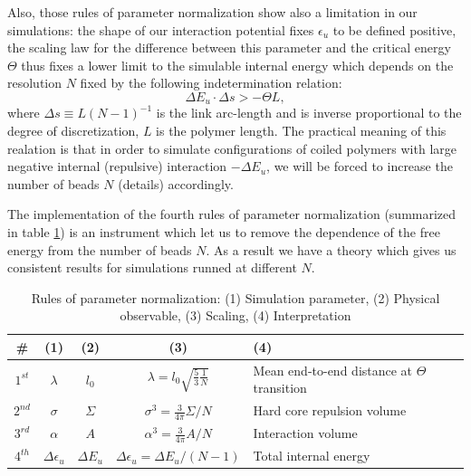 \documentclass[12pt,a4paper,notitlepage]{article}
\begin{document}
Also, those rules of parameter normalization show also a
limitation in our simulations: the shape of our interaction potential
fixes $\epsilon_u$ to be defined positive, the scaling law for
the difference between this parameter and the critical energy $\Theta$
thus fixes a lower limit to the simulable internal energy which
depends on the resolution $N$ fixed by the following indetermination
relation:
\begin{equation}
\Delta E_u \cdot \Delta s > - \Theta L,
\label{eq:indetermination}
\end{equation}
where $\Delta s \equiv L (N-1)^{-1}$ is the link arc-length and
is inverse proportional to the degree of discretization, $L$ is the
polymer length.
The practical
meaning of this realation is that in order to simulate configurations
of coiled polymers with large negative internal (repulsive) interaction
$-\Delta E_u$, we will be forced to increase the number of beads $N$ 
(details) accordingly.

The implementation of the fourth rules of parameter
normalization (summarized in table \ref{tab:renor}) is an instrument
which let us to remove the dependence of the free energy from the
number of beads $N$. As a result we have a theory which gives us
consistent results for simulations runned at different $N$.

\begin{table}[h]
\centering
  \begin{tabular}{c|c|c|c|l}
    {\bf \# } & {\bf (1) } & {\bf (2) } & {\bf (3)} & {\bf (4)}\\
\hline
$1^{st}$ & $\lambda$ & $l_0$ & 
  $\lambda = l_0 \sqrt{\frac{5}{3} \frac{1}{N}}$ &
  Mean end-to-end distance at $\Theta$ transition \\
$2^{nd}$ & $\sigma$ & $\Sigma$ &  $\sigma^3 = \frac{3}{4\pi} \Sigma / N$ &
  Hard core repulsion volume \\
$3^{rd}$ & $\alpha$ & $A$ & $\alpha^3 = \frac{3}{4\pi} A / N$ &
   Interaction volume\\
$4^{th}$ & $\Delta \epsilon_u$ & $\Delta E_u$ & $\Delta  \epsilon_u = \Delta
E_u / (N - 1)$ &
   Total internal energy\\
  \end{tabular}
  \caption{Rules of parameter normalization: (1) Simulation parameter,
  (2) Physical observable, (3) Scaling, (4) Interpretation}
  \label{tab:renor}
\end{table}
\end{document}
